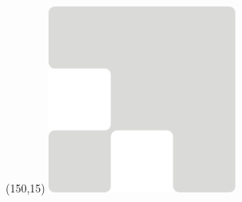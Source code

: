 \begin{textblock}{1}(150,15)
  \includegraphics[width=6.2cm,height=6.2cm]{lshift-logo-grey-corner}
\end{textblock}

\newpage
\rfoot{}

\tableofcontents
\newpage
